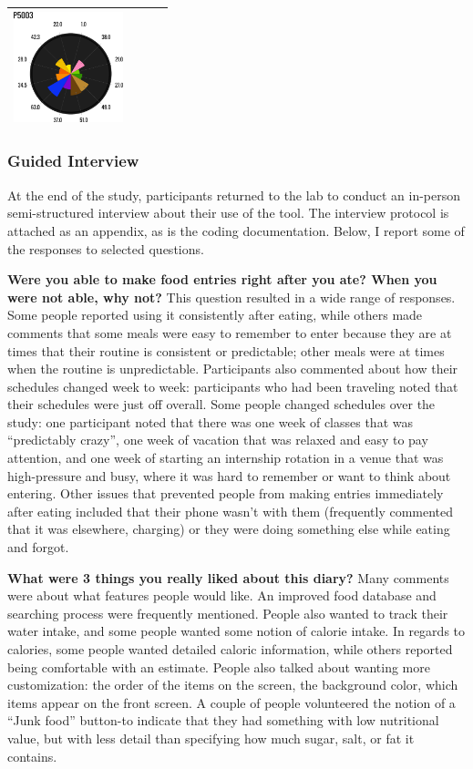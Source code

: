 \begin{table}[htbp]
\begin{tabular}{p{1.25in}p{1.25in}p{1.25in}p{1.25in}}
\includegraphics[width=1.25in]{./images/cont4/polar_charts/p5003}\\
\bottomrule
\end{tabular}
\end{table}

\subsubsection{Guided Interview}
At the end of the study, participants returned to the lab to conduct an in-person semi-structured interview about their use of the tool. The interview protocol is attached as an appendix, as is the coding documentation. Below, I report some of the responses to selected questions. 

\textbf{Were you able to make food entries right after you ate? When you were not able, why not?}
This question resulted in a wide range of responses. Some people reported using it consistently after eating, while others made comments that some meals were easy to remember to enter because they are at times that their routine is consistent or predictable; other meals were at times when the routine is unpredictable. Participants also commented about how their schedules changed week to week: participants who had been traveling noted that their schedules were just off overall. Some people changed schedules over the study: one participant noted that there was one week of classes that was ``predictably crazy'', one week of vacation that was relaxed and easy to pay attention, and one week of starting an internship rotation in a venue that was high-pressure and busy, where it was hard to remember or want to think about entering. Other issues that prevented people from making entries immediately after eating included that their phone wasn't with them (frequently commented that it was elsewhere, charging) or they were doing something else while eating and forgot. 

\textbf{What were 3 things you really liked about this diary?}
Many comments were about what features people would like. An improved food database and searching process were frequently mentioned. People also wanted to track their water intake, and some people wanted some notion of calorie intake. In regards to calories, some people wanted detailed caloric information, while others reported being comfortable with an estimate. People also talked about wanting more customization: the order of the items on the screen, the background color, which items appear on the front screen. A couple of people volunteered the notion of a ``Junk food'' button-to indicate that they had something with low nutritional value, but with less detail than specifying how much sugar, salt, or fat it contains. 

